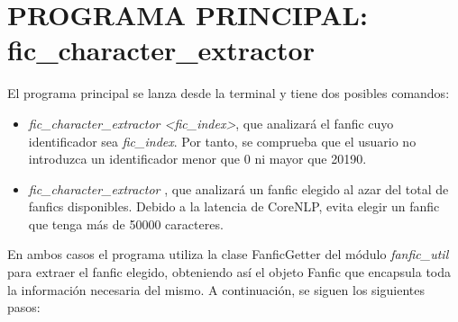 \documentclass{pre-tfg}
\newcommand{\finalProgramName}{fic\_character\_extractor }
\begin{document}
\begin{comment}

\begin{figure}
	\centering
	\texttt{[image: ac\_fverbs\_2]}
	\caption{Verbos más frecuentes en el dataset de amsitad en las frases que mencionan a dos personajes concretos.}
	\label{fig:f_verb_freq_in_character_mentions}
\end{figure}


\begin{figure}
	\centering
	\texttt{[image: crowhas\_everbs\_0]}
	\caption{Verbos más frecuentes en el dataset de enemistad en las frases que mencionan a dos personajes concretos.}
	\label{fig:e_verb_freq_in_character_mentions}
\end{figure}

\end{comment}



\cleardoublepage
\section{PROGRAMA PRINCIPAL: fic\_character\_extractor }
\label{sec:main}

El programa principal se lanza desde la terminal y tiene dos posibles comandos:
\begin{itemize}
	\item \textit{\finalProgramName <fic\_index>}, que analizará el fanfic cuyo identificador sea \textit{fic\_index}. Por tanto, se comprueba que el usuario no introduzca un identificador menor que 0 ni mayor que 20190.
	\item \textit{\finalProgramName}, que analizará un fanfic elegido al azar del total de fanfics disponibles. Debido a la latencia de CoreNLP, evita elegir un fanfic que tenga más de 50000 caracteres.
\end{itemize}

En ambos casos el programa utiliza la clase FanficGetter del módulo \textit{fanfic\_util} para extraer el fanfic elegido, obteniendo así el objeto Fanfic que encapsula toda la información necesaria del mismo. A continuación, se siguen los siguientes pasos:
\end{document}

